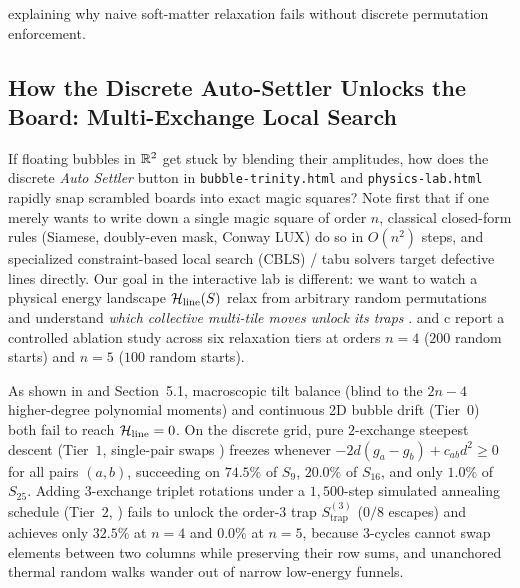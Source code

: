explaining why naive soft-matter relaxation fails without discrete permutation enforcement.

\subsection{How the Discrete Auto-Settler Unlocks the Board: Multi-Exchange Local Search}

If floating bubbles in $\mathbb{R}^2$ get stuck by blending their amplitudes, how does the discrete \emph{Auto Settler} button in \texttt{bubble-trinity.html} and \texttt{physics-lab.html} rapidly snap scrambled boards into exact magic squares? Note first that if one merely wants to write down a single magic square of order $n$, classical closed-form rules (Siamese, doubly-even mask, Conway LUX) do so in $O(n^2)$ steps, and specialized constraint-based local search (CBLS) / tabu solvers \cite{glover1989tabu,codognet2001yet,vanhentenryck2005constraint} target defective lines directly. Our goal in the interactive lab is different: we want to watch a physical energy landscape $\mathcal{H}_{\mathrm{line}}(S)$ relax from arbitrary random permutations and understand \emph{which collective multi-tile moves unlock its traps} \cite{mladenovic1997variable,lourenco2003iterated}.  and c report a controlled ablation study across six relaxation tiers at orders $n=4$ ($200$ random starts) and $n=5$ ($100$ random starts).

As shown in  and Section~5.1, macroscopic tilt balance (blind to the $2n-4$ higher-degree polynomial moments) and continuous 2D bubble drift (Tier~$0$) both fail to reach $\mathcal{H}_{\mathrm{line}} = 0$. On the discrete grid, pure $2$-exchange steepest descent (Tier~$1$, single-pair swaps \cite{kawasaki1966diffusion}) freezes whenever $-2d(g_a-g_b) + c_{ab}d^2 \ge 0$ for all pairs $(a,b)$, succeeding on $74.5\%$ of $S_9$, $20.0\%$ of $S_{16}$, and only $1.0\%$ of $S_{25}$. Adding $3$-exchange triplet rotations under a $1{,}500$-step simulated annealing schedule (Tier~$2$, \cite{kirkpatrick1983optimization}) fails to unlock the order-$3$ trap $S_{\mathrm{trap}}^{(3)}$ ($0/8$ escapes) and achieves only $32.5\%$ at $n=4$ and $0.0\%$ at $n=5$, because $3$-cycles cannot swap elements between two columns while preserving their row sums, and unanchored thermal random walks wander out of narrow low-energy funnels.


